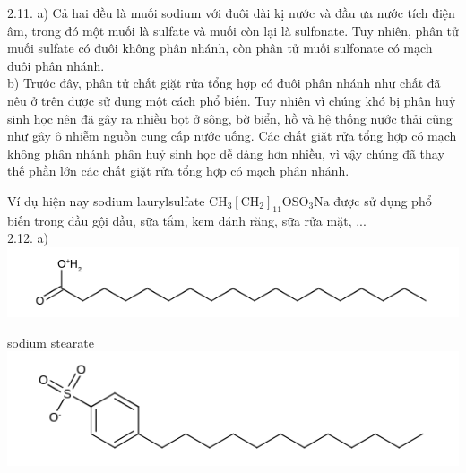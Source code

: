 \documentclass[10pt]{article}
\begin{document}
2.11. a) Cả hai đều là muối sodium với đuôi dài kị nước và đầu ưa nước tích điện âm, trong đó một muối là sulfate và muối còn lại là sulfonate. Tuy nhiên, phân tử muối sulfate có đuôi không phân nhánh, còn phân tử muối sulfonate có mạch đuôi phân nhánh.\\
b) Trước đây, phân tử chất giặt rửa tổng hợp có đuôi phân nhánh như chất đã nêu ở trên được sử dụng một cách phổ biến. Tuy nhiên vì chúng khó bị phân huỷ sinh học nên đã gây ra nhiều bọt ở sông, bờ biển, hồ và hệ thống nước thải cũng như gây ô nhiễm nguồn cung cấp nước uống. Các chất giặt rửa tổng hợp có mạch không phân nhánh phân huỷ sinh học dễ dàng hơn nhiều, vì vậy chúng đã thay thế phần lớn các chất giặt rửa tổng hợp có mạch phân nhánh.

Ví dụ hiện nay sodium laurylsulfate $\mathrm{CH}_{3}\left[\mathrm{CH}_{2}\right]_{11} \mathrm{OSO}_{3} \mathrm{Na}$ được sử dụng phổ biến trong dầu gội đầu, sữa tắm, kem đánh răng, sữa rửa mặt, ...\\
2.12. a)\\
\includegraphics{smile-a810cbe4b7b7e4dff4512c1992550588e1047561}

sodium stearate\\
\includegraphics{smile-683f445d4e98433383d6322cb1565dc69f146669}
\end{document}
